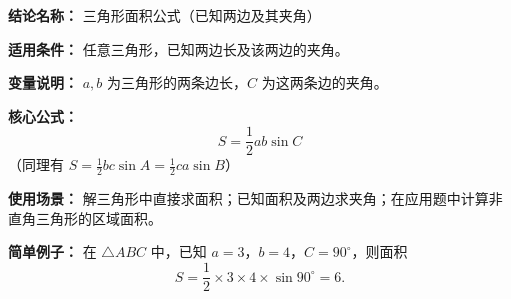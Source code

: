 \textbf{结论名称：} 三角形面积公式（已知两边及其夹角）

\textbf{适用条件：} 任意三角形，已知两边长及该两边的夹角。

\textbf{变量说明：} \(a,b\) 为三角形的两条边长，\(C\) 为这两条边的夹角。

\textbf{核心公式：} 
\[
\boxed{S = \frac{1}{2}ab\sin C}
\]
（同理有 \(S=\frac{1}{2}bc\sin A=\frac{1}{2}ca\sin B\)）

\textbf{使用场景：} 解三角形中直接求面积；已知面积及两边求夹角；在应用题中计算非直角三角形的区域面积。

\textbf{简单例子：} 在 \(\triangle ABC\) 中，已知 \(a=3\)，\(b=4\)，\(C=90^\circ\)，则面积
\[
S = \frac{1}{2} \times 3 \times 4 \times \sin 90^\circ = 6.
\]